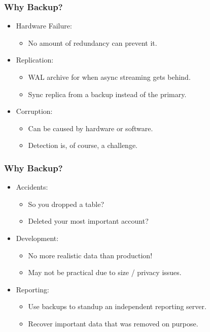 \begin{frame}
    \frametitle{Why Backup?}

    \begin{itemize}
        \item Hardware Failure:

        \begin{itemize}
            \item No amount of redundancy can prevent it.
        \end{itemize}

        \item Replication:

        \begin{itemize}
            \item WAL archive for when async streaming gets behind.
            \item Sync replica from a backup instead of the primary.
        \end{itemize}

        \item Corruption:

        \begin{itemize}
            \item Can be caused by hardware or software.
            \item Detection is, of course, a challenge.
        \end{itemize}
    \end{itemize}
\end{frame}

\begin{frame}
    \frametitle{Why Backup?}

    \begin{itemize}
        \item Accidents:

        \begin{itemize}
            \item So you dropped a table?
            \item Deleted your most important account?
        \end{itemize}

        \item Development:

        \begin{itemize}
            \item No more realistic data than production!
            \item May not be practical due to size / privacy issues.
        \end{itemize}

        \item Reporting:

        \begin{itemize}
            \item Use backups to standup an independent reporting server.
            \item Recover important data that was removed on purpose.
        \end{itemize}
    \end{itemize}
\end{frame}

